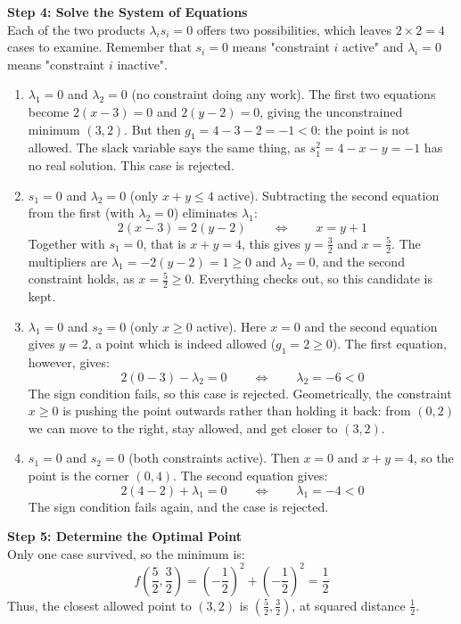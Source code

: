 \documentclass[]{article}
\begin{document}
	\textbf{Step 4: Solve the System of Equations}\\
	Each of the two products $\lambda_i s_i = 0$ offers two possibilities, which leaves $2 \times 2 = 4$ cases to examine.
	Remember that $s_i = 0$ means "constraint $i$ active" and $\lambda_i = 0$ means "constraint $i$ inactive".

	\begin{enumerate}
		\item $\lambda_1 = 0$ and $\lambda_2 = 0$ (no constraint doing any work).
		The first two equations become $2(x-3) = 0$ and $2(y-2) = 0$, giving the unconstrained minimum $(3,2)$.
		But then $g_1 = 4 - 3 - 2 = -1 < 0$: the point is not allowed.
		The slack variable says the same thing, as $s_1^2 = 4 - x - y = -1$ has no real solution.
		This case is rejected.

		\item $s_1 = 0$ and $\lambda_2 = 0$ (only $x + y \leq 4$ active).
		Subtracting the second equation from the first (with $\lambda_2 = 0$) eliminates $\lambda_1$:
		$$
		2(x-3) = 2(y-2)
		\qquad \Longleftrightarrow \qquad
		x = y + 1
		$$
		Together with $s_1 = 0$, that is $x + y = 4$, this gives $y = \frac{3}{2}$ and $x = \frac{5}{2}$.
		The multipliers are $\lambda_1 = -2(y-2) = 1 \geq 0$ and $\lambda_2 = 0$, and the second constraint holds, as $x = \frac{5}{2} \geq 0$.
		Everything checks out, so this candidate is kept.

		\item $\lambda_1 = 0$ and $s_2 = 0$ (only $x \geq 0$ active).
		Here $x = 0$ and the second equation gives $y = 2$, a point which is indeed allowed ($g_1 = 2 \geq 0$).
		The first equation, however, gives:
		$$
		2(0-3) - \lambda_2 = 0
		\qquad \Longleftrightarrow \qquad
		\lambda_2 = -6 < 0
		$$
		The sign condition fails, so this case is rejected.
		Geometrically, the constraint $x \geq 0$ is pushing the point outwards rather than holding it back: from $(0,2)$ we can move to the right, stay allowed, and get closer to $(3,2)$.

		\item $s_1 = 0$ and $s_2 = 0$ (both constraints active).
		Then $x = 0$ and $x + y = 4$, so the point is the corner $(0,4)$.
		The second equation gives:
		$$
		2(4-2) + \lambda_1 = 0
		\qquad \Longleftrightarrow \qquad
		\lambda_1 = -4 < 0
		$$
		The sign condition fails again, and the case is rejected.
	\end{enumerate}

	\textbf{Step 5: Determine the Optimal Point}\\
	Only one case survived, so the minimum is:
	$$
	f\left( \frac{5}{2}, \frac{3}{2} \right)
	= \left( -\frac{1}{2} \right)^2 + \left( -\frac{1}{2} \right)^2
	= \frac{1}{2}
	$$
	Thus, the closest allowed point to $(3,2)$ is $\left( \frac{5}{2}, \frac{3}{2} \right)$, at squared distance $\frac{1}{2}$.
\end{document}
